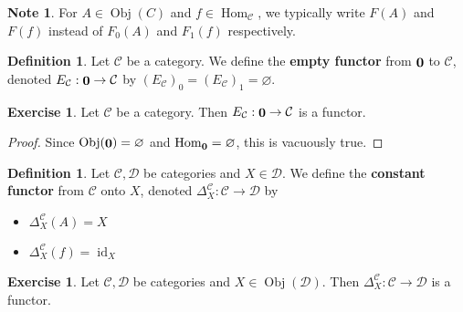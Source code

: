 \documentclass{book}
\theoremstyle{definition}
\newtheorem{defn}[definition]{Definition}
\newtheorem{note}[definition]{Note}
\newtheorem{ex}[definition]{Exercise}
\newcommand{\Del}{\Delta}
\newcommand{\MC}{\mathcal{C}}
\newcommand{\MD}{\mathcal{D}}
\DeclareMathOperator{\id}{id}
\DeclareMathOperator{\Obj}{Obj}
\DeclareMathOperator{\Hom}{Hom}
\DeclareMathOperator*{\0}{\mbf{0}}
\DeclareMathOperator*{\1}{\mbf{1}}
\begin{document}
	\begin{note}
		For $A \in \Obj(C)$ and $f \in \Hom_{\MC}$, we typically write $F(A)$ and $F(f)$ instead of $F_0(A)$ and $F_1(f)$ respectively.
	\end{note}

	\begin{defn}
		Let $\MC$ be a category. We define the \textbf{empty functor} from $\0$ to $\MC$, denoted $E_{\MC}: \0 \rightarrow \MC$ by $(E_{\MC})_0 = (E_{\MC})_1 = \varnothing$. 
	\end{defn}

	\begin{ex}
		Let $\MC$ be a category. Then $E_{\MC}: \0 \rightarrow \MC$ is a functor.
	\end{ex}

	\begin{proof}
		Since $\Obj(\0) = \varnothing$ and $\Hom_{\0} = \varnothing$, this is vacuously true. 
	\end{proof}

	\begin{defn}
		Let $\MC, \MD$ be categories and $X \in \MD$. We define the \textbf{constant functor} from $\MC$ onto $X$, denoted $\Del^{\MC}_X: \MC \rightarrow \MD$ by 
		\begin{itemize}
			\item $\Del^{\MC}_X (A) = X$
			\item $\Del^{\MC}_X (f) = \id_X$
		\end{itemize}
	\end{defn}
	
	\begin{ex}
		Let $\MC, \MD$ be categories and $X \in \Obj(\MD)$. Then $\Del^{\MC}_X : \MC \rightarrow \MD$ is a functor.
	\end{ex}
\end{document}
